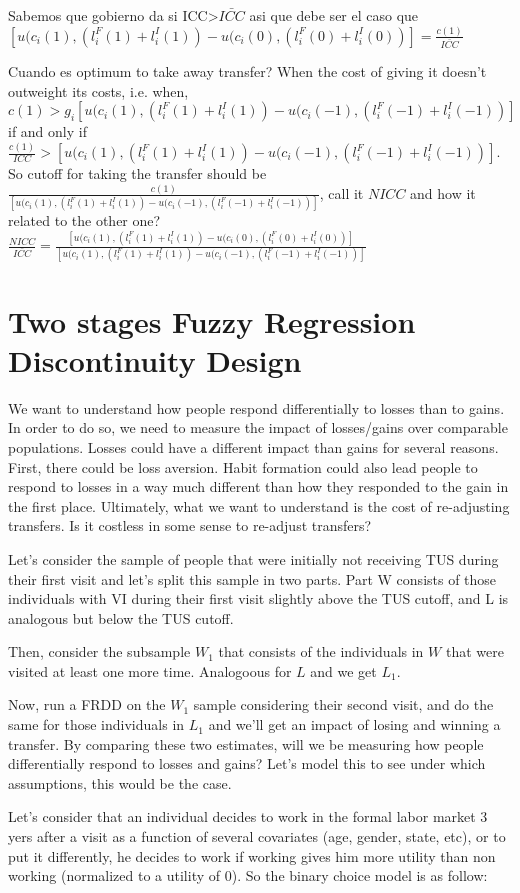 \documentclass[12pt]{article}
\begin{document}
Sabemos que gobierno da si ICC>$\bar{ICC}$ asi que debe ser el caso que $[u(c_i(1),(l^F_i(1)+l^I_i(1))-u(c_i(0),(l^F_i(0)+l^I_i(0))]=\frac{c(1)}{\bar{ICC}}$

Cuando es optimum to take away transfer? When the cost of giving it doesn't outweight its costs, i.e. when, $c(1)>g_i[u(c_i(1),(l^F_i(1)+l^I_i(1))-u(c_i(-1),(l^F_i(-1)+l^I_i(-1))]$ if and only if $\frac{c(1)}{ICC}>[u(c_i(1),(l^F_i(1)+l^I_i(1))-u(c_i(-1),(l^F_i(-1)+l^I_i(-1))]$. So cutoff for taking the transfer should be $\frac{c(1)}{[u(c_i(1),(l^F_i(1)+l^I_i(1))-u(c_i(-1),(l^F_i(-1)+l^I_i(-1))]}$, call it $NICC$ and how it related to the other one? $\frac{NICC}{\bar{ICC}} = \frac{[u(c_i(1),(l^F_i(1)+l^I_i(1))-u(c_i(0),(l^F_i(0)+l^I_i(0))]}{[u(c_i(1),(l^F_i(1)+l^I_i(1))-u(c_i(-1),(l^F_i(-1)+l^I_i(-1))]}$

\section{Two stages Fuzzy Regression Discontinuity Design}
We want to understand how people respond differentially to losses than to gains. In order to do so, we need to measure the impact of losses/gains over comparable populations. Losses could have a different impact than gains for several reasons. First, there could be loss aversion. Habit formation could also lead people to respond to losses in a way much different than how they responded to the gain in the first place. Ultimately, what we want to understand is the cost of re-adjusting transfers. Is it costless in some sense to re-adjust transfers?

Let's consider the sample of people that were initially not receiving TUS during their first visit and let's split this sample in two parts. Part W consists of those individuals with VI during their first visit slightly above the TUS cutoff, and L is analogous but below the TUS cutoff.

Then, consider the subsample $W_1$ that consists of the individuals in $W$ that were visited at least one more time. Analogoous for $L$ and we get $L_1$.

Now, run a FRDD on the $W_1$ sample considering their second visit, and do the same for those individuals in $L_1$ and we'll get an impact of losing and winning a transfer. By comparing these two estimates, will we be measuring how people differentially respond to losses and gains? Let's model this to see under which assumptions, this would be the case.

Let's consider that an individual decides to work in the formal labor market 3 yers after a visit as a function of several covariates (age, gender, state, etc), or to put it differently, he decides to work if working gives him more utility than non working (normalized to a utility of 0). So the binary choice model is as follow:
\end{document}

